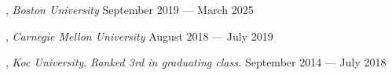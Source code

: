 
, \textit{Boston University}	\hfill September 2019 --- March 2025

, \textit{Carnegie Mellon University} \hfill	August 2018 --- July 2019

, \textit{Koc University}, \textit{Ranked 3rd in graduating class.} \hfill	September 2014 --- July 2018


